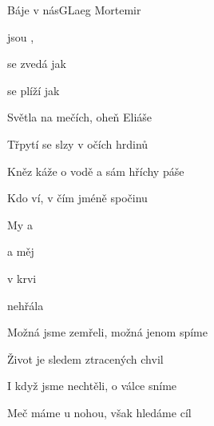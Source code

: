 \setcounter{page}{6}
\begin{song}{Báje v nás}{G}{Laeg Mortemir}

\begin{SBVerse}

 jsou ,  

 se zvedá jak  

   

 se plíží jak 

\end{SBVerse}

\begin{SBVerse}

Světla na mečích, oheň Eliáše

Třpytí se slzy v očích hrdinů

Kněz káže o vodě a sám hříchy páše

Kdo ví, v čím jméně spočinu

\end{SBVerse}

\begin{SBChorus}

My  a   

  a  měj 

  v krvi 

 nehřála 

\end{SBChorus}

\begin{SBVerse}

Možná jsme zemřeli, možná jenom spíme

Život je sledem ztracených chvil

I když jsme nechtěli, o válce sníme

Meč máme u nohou, však hledáme cíl

\end{SBVerse}

\begin{SBChorus}

\end{SBChorus}

\begin{SBChorus*}


\end{SBChorus*}
\end{song}

